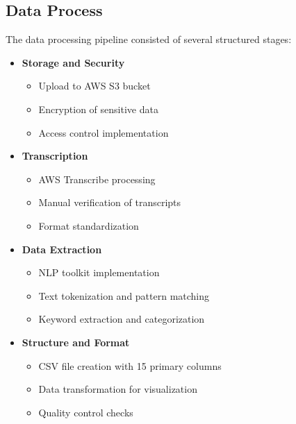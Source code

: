 \documentclass[12pt,a4paper]{article}
\begin{document}
\subsection{Data Process}
The data processing pipeline consisted of several structured stages:
\begin{itemize}
\item \textbf{Storage and Security}
\begin{itemize}
\item Upload to AWS S3 bucket
\item Encryption of sensitive data
\item Access control implementation
\end{itemize}
\item \textbf{Transcription}
\begin{itemize}
\item AWS Transcribe processing
\item Manual verification of transcripts
\item Format standardization
\end{itemize}

\item \textbf{Data Extraction}
\begin{itemize}
\item NLP toolkit implementation
\item Text tokenization and pattern matching
\item Keyword extraction and categorization
\end{itemize}

\item \textbf{Structure and Format}
\begin{itemize}
\item CSV file creation with 15 primary columns
\item Data transformation for visualization
\item Quality control checks
\end{itemize}
\end{itemize}
\end{document}
